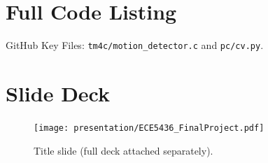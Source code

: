 \documentclass[11pt]{IEEEtran}
\begin{document}
\appendices
\section{Full Code Listing}
GitHub Key Files: \verb|tm4c/motion_detector.c| and
\verb|pc/cv.py|.

\section{Slide Deck}
\begin{figure}[t]
\centering
\texttt{[image: presentation/ECE5436\_FinalProject.pdf]}
\caption{Title slide (full deck attached separately).}
\end{figure}

% 
\end{document}
